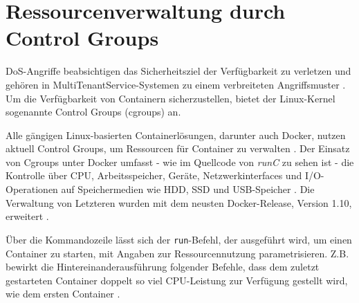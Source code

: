 \documentclass[../main.tex]{subfiles}
\begin{document}



	\section{Ressourcenverwaltung durch Control Groups}
  \label{secCgroups}
		\acrshort{DoS}-Angriffe beabsichtigen das Sicherheitsziel der Verfügbarkeit zu verletzen und gehören in \gls{MultiTenantService}-Systemen zu einem verbreiteten Angriffsmuster \cite[S.5]{dockerSec1}. Um die Verfügbarkeit von Containern sicherzustellen, bietet der Linux-Kernel sogenannte Control Groups (\acrshort{cgroups}) an.

		Alle gängigen Linux-basierten Containerlösungen, darunter auch Docker, nutzen aktuell Control Groups, um Ressourcen für Container zu verwalten \cite[S.16]{dockerSec2}. Der Einsatz von Cgroups unter Docker umfasst - wie im Quellcode von \emph{runC} zu sehen ist - die Kontrolle über \acrshort{CPU}, Arbeitsspeicher, Geräte, Netzwerkinterfaces und \acrshort{I/O}-Operationen auf Speichermedien wie \acrshort{HDD}, \acrshort{SSD} und \acrshort{USB}-Speicher \cite{cgroupsRedhat}\cite{githubRunCCgroups}. Die Verwaltung von Letzteren wurden mit dem neusten Docker-Release, Version 1.10, erweitert \cite{docker110}.


		Über die Kommandozeile lässt sich der \texttt{run}-Befehl, der ausgeführt wird, um einen Container zu starten, mit Angaben zur Ressourcennutzung parametrisieren. Z.B. bewirkt die Hintereinanderausführung folgender Befehle, dass dem zuletzt gestarteten Container doppelt so viel CPU-Leistung zur Verfügung gestellt wird, wie dem ersten Container \cite{dockerRun}.
\end{document}
